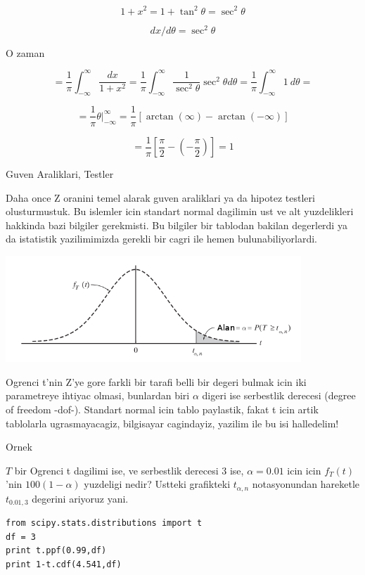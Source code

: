 \documentclass[12pt,fleqn]{article}\usepackage{../common}
\begin{document}
$$ 1 + x^2 = 1 + \tan^2\theta = \sec^2\theta$$

$$ dx / d\theta = \sec^2\theta $$

O zaman 

$$ =
\frac{ 1}{\pi} \int _{ -\infty}^{\infty} \frac{ dx}{1 + x^2}   =
\frac{ 1}{\pi} \int _{ -\infty}^{\infty}  \frac{ 1}{\sec^2\theta}\sec^2\theta d\theta = 
\frac{ 1}{\pi} \int _{ -\infty}^{\infty}  1 \ d\theta = 
 $$

$$ = 
\frac{ 1}{\pi} \theta | _{ -\infty}^{\infty}   = 
\frac{ 1}{\pi} [\arctan(\infty) - \arctan(-\infty)]
 $$

$$ =
\frac{ 1}{\pi} [\frac{ \pi}{2} - (-\frac{ \pi}{2}) ] = 1
 $$


Guven Araliklari, Testler

Daha once Z oranini temel alarak guven araliklari ya da hipotez testleri
olusturmustuk. Bu islemler icin standart normal dagilimin ust ve alt
yuzdelikleri hakkinda bazi bilgiler gerekmisti. Bu bilgiler bir tablodan
bakilan degerlerdi ya da istatistik yazilimimizda gerekli bir cagri ile
hemen bulunabiliyorlardi.

\includegraphics[height=4cm]{t2.png}

Ogrenci t'nin Z'ye gore farkli bir tarafi belli bir degeri bulmak icin iki
parametreye ihtiyac olmasi, bunlardan biri $\alpha$ digeri ise serbestlik
derecesi (degree of freedom -dof-). Standart normal icin tablo paylastik,
fakat t icin artik tablolarla ugrasmayacagiz, bilgisayar cagindayiz,
yazilim ile bu isi halledelim! 

Ornek

$T$ bir Ogrenci t dagilimi ise, ve serbestlik derecesi 3 ise, $\alpha=0.01$
icin icin $f_T(t)$'nin $100(1-\alpha)$ yuzdeligi nedir? Ustteki grafikteki
$t_{\alpha,n}$ notasyonundan hareketle $t_{0.01,3}$ degerini ariyoruz yani.

\begin{verbatim}
from scipy.stats.distributions import t
df = 3
print t.ppf(0.99,df)
print 1-t.cdf(4.541,df)
\end{verbatim}
\end{document}
